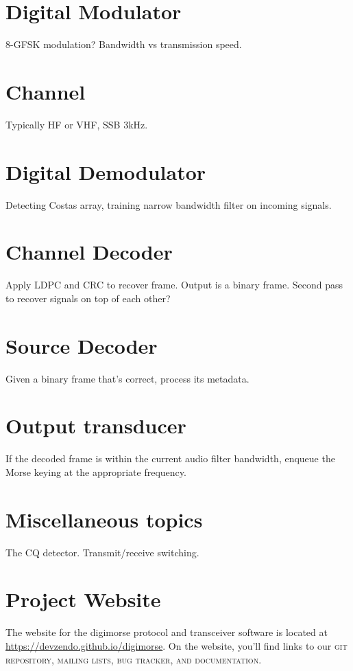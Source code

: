 \documentclass[a4paper]{tufte-handout}
\newcommand{\textls}[2][5]{%
    \begingroup\addfontfeatures{LetterSpace=#1}#2\endgroup
  }
\renewcommand{\smallcapsspacing}[1]{\textls[10]{#1}}
\renewcommand{\smallcaps}[1]{\smallcapsspacing{\scshape\MakeTextLowercase{#1}}}
\begin{document}
\section{Digital Modulator}
8-GFSK modulation? Bandwidth vs transmission speed.

\section{Channel}
Typically HF or VHF, SSB 3kHz.

\section{Digital Demodulator}
Detecting Costas array, training narrow bandwidth filter on incoming signals. 

\section{Channel Decoder}
Apply LDPC and CRC to recover frame. Output is a binary frame.
Second pass to recover signals on top of each other?

\section{Source Decoder}
Given a binary frame that's correct, process its metadata.

\section{Output transducer}
If the decoded frame is within the current audio filter bandwidth, enqueue the Morse keying at the appropriate frequency.

\section{Miscellaneous topics}
The CQ detector. Transmit/receive switching.

\pagebreak
\section{Project Website}

The website for the digimorse protocol and transceiver software is located at
\url{https://devzendo.github.io/digimorse}. On the website, you'll find
links to our \smallcaps{git} repository, mailing lists, bug tracker, and documentation.
\end{document}
